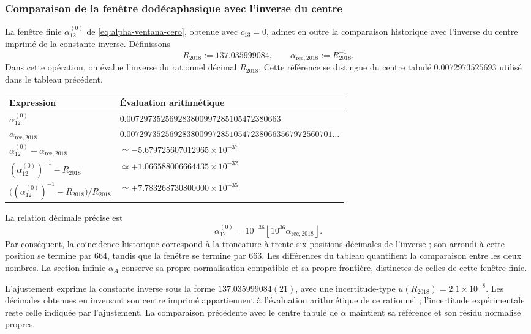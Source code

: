 \subsubsection{Comparaison de la fenêtre dodécaphasique avec l'inverse du centre}
\label{sec:contraste-ventana-reciproco}

La fenêtre finie \(\alpha_{12}^{(0)}\) de
\eqref{eq:alpha-ventana-cero}, obtenue avec \(c_{13}=0\), admet en outre
la comparaison historique avec l'inverse du centre imprimé de la
constante inverse. Définissons
\[
 R_{2018}:=137.035999084,\qquad
 \alpha_{\mathrm{rec},2018}:=R_{2018}^{-1}.
\]
Dans cette opération, on évalue l'inverse du rationnel décimal
\(R_{2018}\). Cette référence se distingue du centre tabulé
\(0.0072973525693\) utilisé dans le tableau précédent.

\begin{center}
\begin{tabular}{@{}ll@{}}
\toprule
Expression & Évaluation arithmétique\\
\midrule
\(\alpha_{12}^{(0)}\) &
\(0.007297352569283800997285105472380663\)\\
\(\alpha_{\mathrm{rec},2018}\) &
\(0.007297352569283800997285105472380663567972560701\ldots\)\\
\(\alpha_{12}^{(0)}-\alpha_{\mathrm{rec},2018}\) &
\(\simeq-5.679725607012965\times10^{-37}\)\\
\((\alpha_{12}^{(0)})^{-1}-R_{2018}\) &
\(\simeq+1.066588006664435\times10^{-32}\)\\
\(\bigl((\alpha_{12}^{(0)})^{-1}-R_{2018}\bigr)/R_{2018}\) &
\(\simeq+7.783268730800000\times10^{-35}\)\\
\bottomrule
\end{tabular}
\end{center}

La relation décimale précise est
\[
 \alpha_{12}^{(0)}
 =10^{-36}\left\lfloor10^{36}\alpha_{\mathrm{rec},2018}\right\rfloor.
\]
Par conséquent, la coïncidence historique correspond à la troncature à
trente-six positions décimales de l'inverse ; son arrondi à cette
position se termine par \(664\), tandis que la fenêtre se termine par \(663\).
Les différences du tableau quantifient la comparaison entre les deux
nombres. La section infinie \(\alpha_A\) conserve sa propre normalisation
compatible et sa propre frontière, distinctes de celles de cette fenêtre finie.

L'ajustement exprime la constante inverse sous la forme
\(137.035999084(21)\), avec une incertitude-type
\(u(R_{2018})=2.1\times10^{-8}\)\cite{codata2018}.
Les décimales obtenues en inversant son centre imprimé appartiennent à
l'évaluation arithmétique de ce rationnel ; l'incertitude expérimentale
reste celle indiquée par l'ajustement. La comparaison précédente avec le
centre tabulé de \(\alpha\) maintient sa référence et son résidu
normalisé propres.

